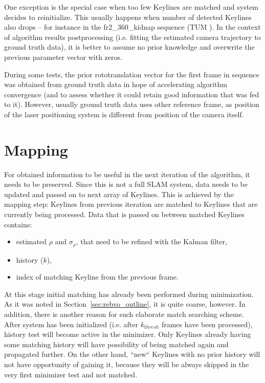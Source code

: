 One exception is the special case when too few Keylines are matched and system decides to reinitialize. This usually happens when number of detected Keylines also drops -- for instance in the fr2\_360\_kidnap sequence (TUM \cite{tum}). In the context of algorithm results postprocessing (i.e. fitting the estimated camera trajectory to ground truth data), it is better to assume no prior knowledge and overwrite the previous parameter vector with zeros.

During some tests, the prior rototranslation vector for the first frame in sequence was obtained from ground truth data in hope of accelerating algorithm convergence (and to assess whether it could retain good information that was fed to it). However, usually ground truth data uses other reference frame, as position of the laser positioning system is different from position of the camera itself.


\section{Mapping}

For obtained information to be useful in the next iteration of the algorithm, it needs to be preserved. Since this is not a full SLAM system, data needs to be updated and passed on to next array of Keylines. This is achieved by the mapping step: Keylines from previous iteration are matched to Keylines that are currently being processed. Data that is passed on between matched Keylines contains:

\begin{itemize}
	\item estimated $\rho$ and $\sigma_{\rho}$, that need to be refined with the Kalman filter,
	\item history ($k$),
	\item index of matching Keyline from the previous frame.
\end{itemize}

At this stage initial matching has already been performed during minimization. As it was noted in Section~\ref{sec:rebvo_outline}, it is quite coarse, however. In addition, there is another reason for such elaborate match searching scheme. After system has been initialized (i.e. after $k_{thresh}$ frames have been processed), history test will become active in the minimizer. Only Keylines already having some matching history will have possibility of being matched again and propagated further. On the other hand, ``new`` Keylines with no prior history will not have opportunity of gaining it, because they will be always skipped in the very first minimizer test and not matched.

